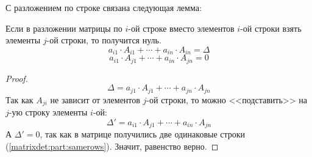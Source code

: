 
С разложением по строке связана следующая лемма:

\begin{lemma}
	\label{matrixdet:rowexpansion:replace}
	Если в разложении матрицы по $i$-ой строке вместо элементов $i$-ой
	строки взять элементы $j$-ой строки, то получится нуль.
	$$
	a_{i1}\cdot A_{i1}+\cdots+a_{in}\cdot A_{in}=\Delta
	$$ $$
	a_{i1}\cdot A_{j1}+\cdots+a_{in}\cdot A_{jn}=0
	$$
\end{lemma}
\begin{proof}
	$$\Delta =a_{j1}\cdot A_{j1}+\cdots+a_{jn}\cdot A_{jn}$$
	Так как $A_{ji}$ не зависит от элементов $j$-ой строки, то можно
	<<подставить>> на $j$-ую строку элементы $i$-ой:
	$$\Delta'=a_{i1}\cdot A_{j1}+\cdots+a_{in}\cdot A_{jn}$$
	А $\Delta'=0$, так как в матрице получились две одинаковые строки
	(\ref{matrixdet:part:samerows}).
	Значит, равенство верно.
\end{proof}

